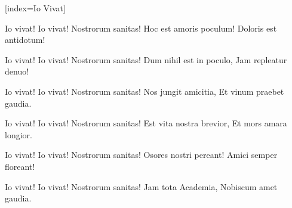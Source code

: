 [index={Io Vivat}]

\beginverse
Io vivat! Io vivat!
Nostrorum sanitas!
Hoc est amoris poculum!
Doloris est antidotum!
\endverse

\beginverse
Io vivat! Io vivat!
Nostrorum sanitas!
Dum nihil est in poculo,
Jam repleatur denuo!
\endverse

\beginverse
Io vivat! Io vivat!
Nostrorum sanitas!
Nos jungit amicitia,
Et vinum praebet gaudia.
\endverse

\beginverse
Io vivat! Io vivat!
Nostrorum sanitas!
Est vita nostra brevior,
Et mors amara longior.
\endverse

\beginverse
Io vivat! Io vivat!
Nostrorum sanitas!
Osores nostri pereant!
Amici semper floreant!
\endverse

\beginverse
Io vivat! Io vivat!
Nostrorum sanitas!
Jam tota Academia,
Nobiscum amet gaudia.
\endverse

\endsong